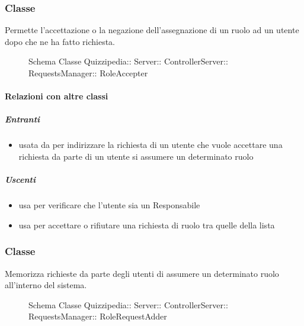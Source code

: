 \subsubsection{Classe }
Permette l'accettazione o la negazione dell'assegnazione di un ruolo ad un utente dopo che ne ha fatto richiesta.
\begin{figure}[H]
\centering
\noindent{}
\caption[Schema Classe RoleAccepter]{Schema Classe Quizzipedia:: Server:: ControllerServer:: RequestsManager:: RoleAccepter}
\end{figure}
\paragraph{Relazioni con altre classi}
\subparagraph{Entranti}
\begin{itemize}
\item usata da  per indirizzare la richiesta di un utente che vuole accettare una richiesta da parte di un utente si assumere un determinato ruolo
\end{itemize}
\subparagraph{Uscenti}
\begin{itemize}
\item usa  per verificare che l'utente sia un Responsabile
\item usa  per accettare o rifiutare una richiesta di ruolo tra quelle della lista
\end{itemize}
\subsubsection{Classe }
Memorizza richieste da parte degli utenti di assumere un determinato ruolo all'interno del sistema.
\begin{figure}[H]
\centering
\noindent{}
\caption[Schema Classe RoleRequestAdder]{Schema Classe Quizzipedia:: Server:: ControllerServer:: RequestsManager:: RoleRequestAdder}
\end{figure}
